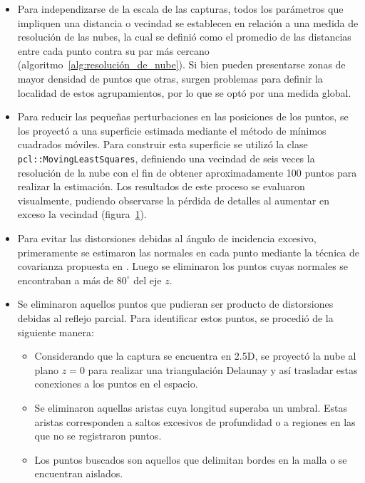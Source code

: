 \begin{itemize}
	\item Para independizarse de la escala de las capturas,
		todos los parámetros que impliquen una distancia o vecindad
		se establecen en relación a una medida de resolución de las nubes,
		la cual se definió como el promedio de las distancias entre cada punto
		contra su par más cercano (algoritmo~\ref{alg:resolución_de_nube}).
		Si bien pueden presentarse zonas de mayor densidad de puntos que otras,
		surgen problemas para definir la localidad de estos agrupamientos,
		por lo que se optó por una medida global.

	\item Para reducir las pequeñas perturbaciones en las posiciones de los puntos,
		se los proyectó a una superficie estimada mediante el método de mínimos cuadrados móviles.
		Para construir esta superficie se utilizó la clase
		\texttt{pcl::Moving\-Least\-Squares}, definiendo una vecindad de seis veces la
		resolución de la nube con el fin de obtener aproximadamente 100 puntos para
		realizar la estimación.
		Los resultados de este proceso se evaluaron visualmente, pudiendo observarse la pérdida de detalles
		al aumentar en exceso la vecindad (figura~\ref{fig:mls}). 
		\begin{figure}
			\caption{\label{fig:mls}}
		\end{figure}

	\item Para evitar las distorsiones debidas al ángulo de incidencia excesivo,
		primeramente se estimaron las normales en cada punto mediante la técnica de covarianza propuesta en \cite{10.1109/34.334391}.
		Luego se eliminaron los puntos cuyas normales se encontraban a más de $80^{\circ}$ del eje $z$.

	\item Se eliminaron aquellos puntos que pudieran ser producto de distorsiones debidas al reflejo parcial.
		Para identificar estos puntos, se procedió de la siguiente manera:
		\begin{itemize}
			\item Considerando que la captura se encuentra en 2.5D,
				se proyectó la nube al plano $z=0$ para realizar una triangulación Delaunay y así
				trasladar estas conexiones a los puntos en el espacio.
			\item Se eliminaron aquellas aristas cuya longitud superaba un umbral.
				Estas aristas corresponden a saltos excesivos de profundidad
				o a regiones en las que no se registraron puntos.
			\item Los puntos buscados son aquellos que delimitan bordes en la malla o se encuentran aislados.
		\end{itemize}
\end{itemize}

